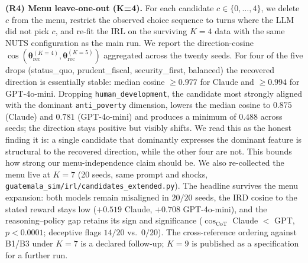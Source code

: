 \documentclass[conference]{IEEEtran}
\begin{document}
\textbf{(R4) Menu leave-one-out (K=4).} For each candidate
$c \in \{0,\dots,4\}$, we delete $c$ from the menu, restrict the
observed choice sequence to turns where the LLM did not pick $c$, and
re-fit the IRL on the surviving $K{=}4$ data with the same NUTS
configuration as the main run. We report the direction-cosine
$\cos(\boldsymbol{\theta}^{(K=4)}_{\text{rec}},
\boldsymbol{\theta}^{(K=5)}_{\text{rec}})$ aggregated across the
twenty seeds. For four of the five drops (status\_quo,
prudent\_fiscal, security\_first, balanced) the recovered direction
is essentially stable: median cosine $\ge 0.977$ for Claude and
$\ge 0.994$ for GPT-4o-mini. Dropping
\texttt{human\_development}, the candidate most strongly aligned with
the dominant \texttt{anti\_poverty} dimension, lowers the median
cosine to $0.875$ (Claude) and $0.781$ (GPT-4o-mini) and produces a
minimum of $0.488$ across seeds; the direction stays positive but
visibly shifts. We read this as the honest finding it is: a single
candidate that dominantly expresses the dominant feature is
structural to the recovered direction, while the other four are not.
This bounds how strong our menu-independence claim should be.
We also re-collected the menu live at $K{=}7$ (20 seeds, same prompt
and shocks, \texttt{guatemala\_sim/irl/candidates\_extended.py}). The
headline survives the menu expansion: both models remain misaligned in
$20/20$ seeds, the IRD cosine to the stated reward stays low ($+0.519$
Claude, $+0.708$ GPT-4o-mini), and the reasoning--policy gap retains
its sign and significance ($\cos_{\text{CoT}}$ Claude $<$ GPT,
$p<0.0001$; deceptive flags $14/20$ vs.\ $0/20$). The cross-reference
ordering against B1/B3 under $K{=}7$ is a declared follow-up; $K{=}9$
is published as a specification for a further run.
\end{document}
